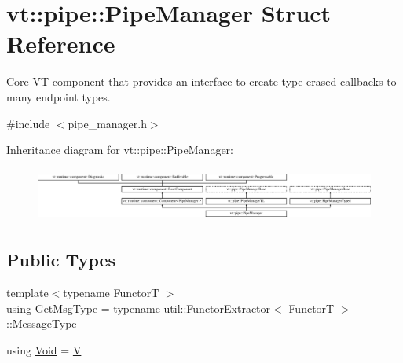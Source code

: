 \hypertarget{structvt_1_1pipe_1_1_pipe_manager}{}\section{vt\+:\+:pipe\+:\+:Pipe\+Manager Struct Reference}
\label{structvt_1_1pipe_1_1_pipe_manager}


Core VT component that provides an interface to create type-\/erased callbacks to many endpoint types.  




{\ttfamily \#include $<$pipe\+\_\+manager.\+h$>$}

Inheritance diagram for vt\+:\+:pipe\+:\+:Pipe\+Manager\+:\begin{figure}[H]
\begin{center}
\leavevmode
\includegraphics[height=1.789137cm]{structvt_1_1pipe_1_1_pipe_manager}
\end{center}
\end{figure}
\subsection*{Public Types}
\begin{DoxyCompactItemize}
\item 
{\footnotesize template$<$typename FunctorT $>$ }\\using \hyperlink{structvt_1_1pipe_1_1_pipe_manager_a221ce8bc0fc6639f43dad1e53a08c0d2}{Get\+Msg\+Type} = typename \hyperlink{structvt_1_1util_1_1_functor_extractor}{util\+::\+Functor\+Extractor}$<$ FunctorT $>$\+::Message\+Type
\item 
using \hyperlink{structvt_1_1pipe_1_1_pipe_manager_ab720c2580ecfd3ab36e49aeaaff64cc6}{Void} = \hyperlink{structvt_1_1pipe_1_1_pipe_manager_t_l_a8d394521df58abfd90c1d81c998f22e3}{V}
\end{DoxyCompactItemize}
